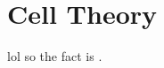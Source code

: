 \documentclass[12pt]{report}
\begin{document}
\section{Cell Theory}
\begin{definition}[Bruh]
    lol so the fact is .
\end{definition}
\end{document}
